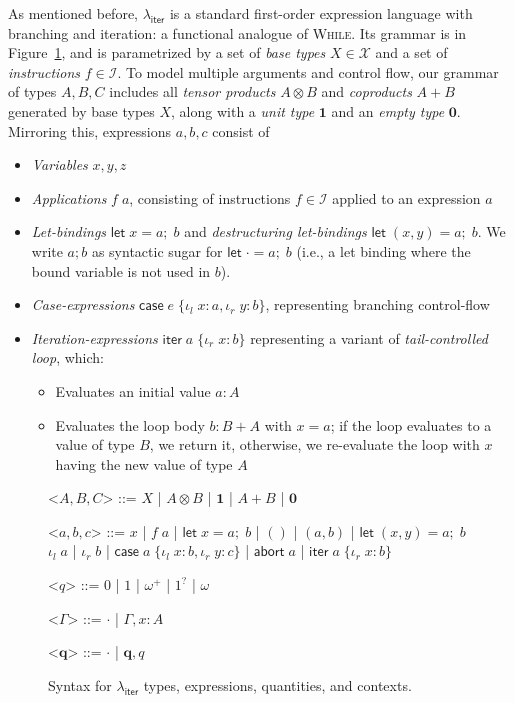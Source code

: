 \documentclass[acmsmall,screen,review]{acmart}
\newcommand{\mc}[1]{\ensuremath{\mathcal{#1}}}
\newcommand{\mb}[1]{\ensuremath{\mathbf{#1}}}
\newcommand{\ms}[1]{\ensuremath{\mathsf{#1}}}
\newcommand{\lto}{:}
\newcommand{\linl}[1]{\iota_l\;{#1}}
\newcommand{\linr}[1]{\iota_r\;{#1}}
\newcommand{\labort}[1]{\ms{abort}\;{#1}}
\newcommand{\letexpr}[3]{\ensuremath{\ms{let}\;#1 = #2;\;#3}}
\newcommand{\caseexpr}[5]{\ms{case}\;#1\;\{\linl{#2} \lto #3, \linr{#4} \lto #5\}}
\newcommand{\liter}[3]{\ms{iter}\;#1\;\{ \linr{#2} \lto #3 \}}
\newcommand{\subiterexp}{\texorpdfstring{\(\lambda_{\ms{iter}}\)}{lambda-iter}}
\newcommand{\zeroq}{0}
\newcommand{\oneq}{1}
\newcommand{\delq}{1^?}
\newcommand{\cpyq}{\omega^+}
\newcommand{\topq}{\omega}
\begin{document}
As mentioned before, \subiterexp{} is a standard first-order expression language with branching and
iteration: a functional analogue of \textsc{While}. Its grammar is in
Figure~\ref{fig:expr-syntax}, and is parametrized by a set of \emph{base types} $X \in \mc{X}$ and
a set of \emph{instructions} $f \in \mc{I}$. 
%
To model multiple arguments and control flow, our grammar of types $A,
B, C$ includes all \emph{tensor products} $A \otimes B$ and \emph{coproducts} $A + B$ generated by
base types $X$, along with a \emph{unit type} $\mb{1}$ and an \emph{empty type} $\mb{0}$.
%
Mirroring this, expressions $a, b, c$ consist of
\begin{itemize}
  \item \emph{Variables} $x, y, z$
  \item \emph{Applications} $f\;a$, consisting of instructions $f \in \mc{I}$ applied to an
  expression $a$
  \item \emph{Let-bindings} $\letexpr{x}{a}{b}$ and \emph{destructuring let-bindings} $\letexpr{(x,
  y)}{a}{b}$. We write $a; b$ as syntactic sugar for $\letexpr{\cdot}{a}{b}$ (i.e., a let binding
  where the bound variable is not used in $b$).
  \item \emph{Case-expressions} $\caseexpr{e}{x}{a}{y}{b}$, representing branching control-flow
  \item \emph{Iteration-expressions} $\liter{a}{x}{b}$ representing a variant of
  \emph{tail-controlled loop}, which:
  \begin{itemize}
    \item Evaluates an initial value $a : A$
    \item Evaluates the loop body $b : B + A$ with $x = a$; if the loop evaluates to a value of type
    $B$, we return it, otherwise, we re-evaluate the loop with $x$ having the new value of type $A$
  \end{itemize}
\end{itemize}

\begin{figure}
  \begin{grammar}
    <\(A, B, C\)> ::= 
    \(X\)
    \;|\; \(A \otimes B\)
    \;|\; \(\mathbf{1}\)
    \;|\; \(A + B\)
    \;|\; \(\mathbf{0}\)

    <\(a, b, c\)> ::=
    \(x\)
    \;|\; \(f\;a\)
    \;|\; \(\letexpr{x}{a}{b}\)
    \;|\; \(()\)
    \;|\; \((a, b)\)
    \;|\; \(\letexpr{(x, y)}{a}{b}\)
    \alt  \(\linl{a}\)
    \;|\; \(\linr{b}\)
    \;|\; \(\caseexpr{a}{x}{b}{y}{c}\)
    \;|\; \(\labort{a}\)
    \;|\; \(\liter{a}{x}{b}\)
    
    <\(q\)> ::= \(\zeroq\) | \(\oneq\) | \(\cpyq\) | \(\delq\) | \(\topq\)

    <\(\Gamma\)> ::= \(\cdot\) \;|\; \(\Gamma, x : A\)

    <\(\mb{q}\)> ::= \(\cdot\) \;|\; \(\mb{q}, q\)
  \end{grammar}
  \caption{Syntax for \subiterexp{} types, expressions, quantities, and contexts.} \Description{}
  \label{fig:expr-syntax}
\end{figure}
\end{document}
